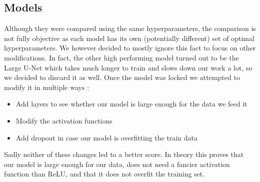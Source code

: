\documentclass[10pt,conference,compsocconf]{IEEEtran}
\begin{document}
\subsection{Models}
Although they were compared using the same hyperparameters, the comparison is not fully objective as each model has its own (potentially different) set of optimal hyperparameters. We however decided to mostly ignore this fact to focus on other modifications. In fact, the other high performing model turned out to be the Large U-Net which takes much longer to train and slows down our work a lot, so we decided to discard it as well.
\newline
Once the model was locked we attempted to modify it in multiple ways : 
\begin{itemize}
\item Add layers to see whether our model is large enough for the data we feed it
\item Modify the activation functions
\item Add dropout in case our model is overfitting the train data
\end{itemize}
Sadly neither of these changes led to a better score. In theory this proves that our model is large enough for our data, does not need a fancier activation function than ReLU, and that it does not overfit the training set.
\end{document}
